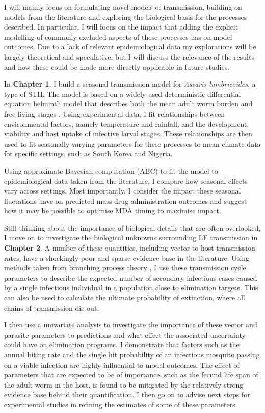 I will mainly focus on formulating novel models of transmission, building on models from the literature and exploring the biological basis for the processes described. In particular, I will focus on the impact that adding the explicit modelling of commonly excluded aspects of these processes has on model outcomes. Due to a lack of relevant epidemiological data my explorations will be largely theoretical and speculative, but I will discuss the relevance of the results and how these could be made more directly applicable in future studies.

In \textbf{Chapter 1}, I build a seasonal transmission model for \textit{Ascaris lumbricoides}, a type of STH. The model is based on a widely used deterministic differential equation helminth model that describes both the mean adult worm burden and free-living stages \cite{Anderson1992}. Using experimental data, I fit relationships between environmental factors, namely temperature and rainfall, and the development, viability and host uptake of infective larval stages. These relationships are then used to fit seasonally varying parameters for these processes to mean climate data for specific settings, such as South Korea and Nigeria.

Using approximate Bayesian computation (ABC) to fit the model to epidemiological data taken from the literature, I compare how seasonal effects vary across settings. Most importantly, I consider the impact these seasonal fluctations have on predicted mass drug administration outcomes and suggest how it may be possible to optimise MDA timing to maximise impact.

Still thinking about the importance of biological details that are often overlooked, I move on to investigate the biological unknowns surrounding LF transmission in \textbf{Chapter 2}. A number of these quantities, including vector to host transmission rates, have a shockingly poor and sparse evidence base in the literature. Using methods taken from branching process theory \cite{Watson1875}, I use these transmission cycle parameters to describe the expected number of secondary infectious cases caused by a single infectious individual in a population close to elimination targets. This can also be used to calculate the ultimate probability of extinction, where all chains of transmission die out.

I then use a univariate analysis to investigate the importance of these vector and parasite parameters to predictions and what effect the associated uncertainty could have on elimination programs. I demonstrate that factors such as the annual biting rate and the single hit probability of an infectious mosquito passing on a viable infection are highly influential to model outcomes. The effect of parameters that are expected to be of importance, such as the fecund life span of the adult worm in the host, is found to be mitigated by the relatively strong evidence base behind their quantification. I then go on to advise next steps for experimental studies in refining the estimates of some of these parameters.

